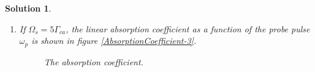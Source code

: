 \documentclass[UTF8,10pt,a4paper]{article}
\theoremstyle{Problem}
\theoremstyle{Solution}
\newtheorem*{sol}{Solution}
\begin{document}
\begin{sol}
\begin{enumerate}
\begin{enumerate}
            \item[iii.] If $\Omega_s=5\Gamma_{ca}$, the linear absorption coefficient as a function of the probe pulse $\omega_p$ is shown in figure \ref{AbsorptionCoefficient-3}.
            \begin{figure}[h]
                \centering
                \caption{The absorption coefficient.}
            \end{figure}
        \end{enumerate}
    \end{enumerate}
\end{sol}
\end{document}
